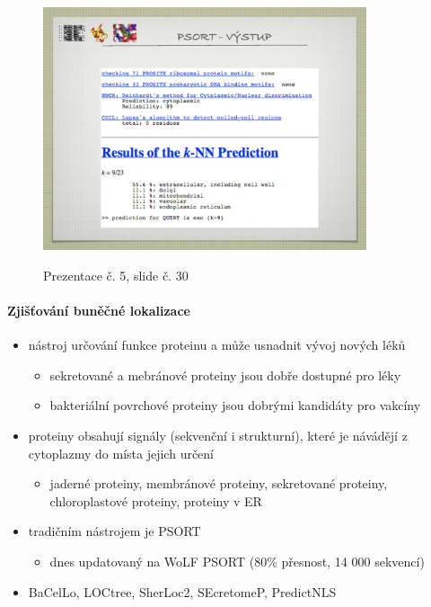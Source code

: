 \documentclass[DIV=8]{scrreprt}
\begin{document}
\begin{figure}
    \caption{Prezentace č. 5, slide č. 30}
    \includegraphics[width=0.85\textwidth]{slides-5/slide-30.jpg}
    \centering
    \label{slides-5-slide-30}
\end{figure}

\paragraph{Zjišťování buněčné lokalizace}
\begin{itemize}[nosep]
    \item nástroj určování funkce proteinu a může usnadnit vývoj nových léků
\begin{itemize}[nosep]
    \item sekretované a mebránové proteiny jsou dobře dostupné pro léky
    \item bakteriální povrchové proteiny jsou dobrými kandidáty pro vakcíny
\end{itemize}

    \item proteiny obsahují signály (sekvenční i strukturní), které je návádějí z cytoplazmy do místa jejich určení
\begin{itemize}[nosep]
    \item jaderné proteiny, membránové proteiny, sekretované proteiny, chloroplastové proteiny, proteiny v ER
\end{itemize}

    \item tradičním nástrojem je PSORT
\begin{itemize}[nosep]
    \item dnes updatovaný na WoLF PSORT (80\% přesnost, 14 000 sekvencí)
\end{itemize}

    \item BaCelLo, LOCtree, SherLoc2, SEcretomeP, PredictNLS
\end{itemize}
\end{document}
